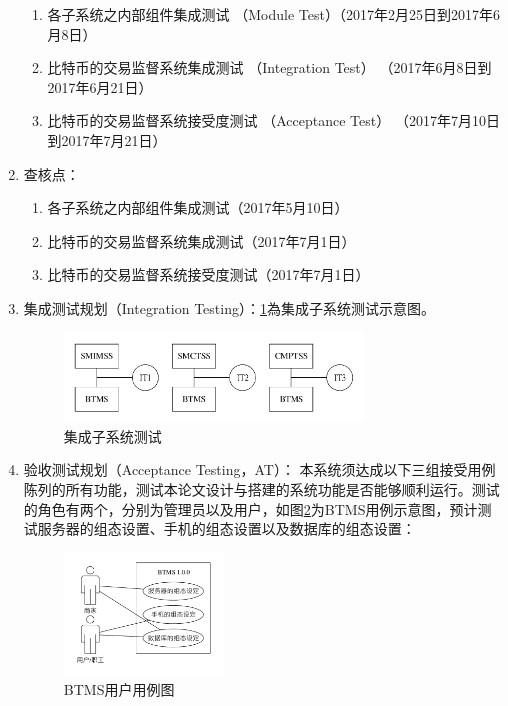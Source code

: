 \begin{enumerate}
	 			\begin{enumerate}
	 				\item 各子系统之内部组件集成测试 （Module Test）（2017年2月25日到2017年6月8日）
	 				\item 比特币的交易监督系统集成测试 （Integration Test） （2017年6月8日到2017年6月21日）
	 				\item 比特币的交易监督系统接受度测试 （Acceptance Test） （2017年7月10日到2017年7月21日）
				\end{enumerate}

			\item 查核点：

				\begin{enumerate}
	 				\item 各子系统之内部组件集成测试（2017年5月10日）
	 				\item 比特币的交易监督系统集成测试（2017年7月1日）
	 				\item 比特币的交易监督系统接受度测试（2017年7月1日）
	 			\end{enumerate}

	 		\item 集成测试规划（Integration Testing）：\ref{IntegrationTesting}為集成子系统测试示意图。
	 			\begin{figure}[!htbp]
					\centering
					\includegraphics[width = 0.75\textwidth]{IntegrationTesting.pdf}
					\caption{集成子系统测试}\label{IntegrationTesting}
				\end{figure}
			\item 验收测试规划（Acceptance Testing，AT）：
				本系统须达成以下三组接受用例陈列的所有功能，测试本论文设计与搭建的系统功能是否能够顺利运行。测试的角色有两个，分别为管理员以及用户，如图\ref{usecasediagram}为BTMS用例示意图，预计测试服务器的组态设置、手机的组态设置以及数据库的组态设置：

					\begin{figure}[!htbp]
						\centering
						\includegraphics[width = 0.4\textwidth]{usecasediagram.pdf}
						\caption{BTMS用户用例图}\label{usecasediagram}
					\end{figure}


\end{enumerate}
